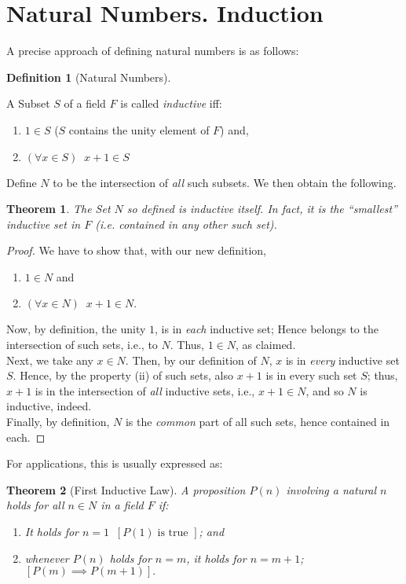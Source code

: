 \documentclass[12pt]{book}
\newtheorem{theorem}{Theorem}
\theoremstyle{definition}
\newtheorem{definition}{Definition}[section]
\begin{document}
\section{Natural Numbers. Induction}
A precise approach of defining natural numbers is as follows: 
\begin{definition}[Natural Numbers]
\

A Subset $S$ of a field $F$ is called \textit{inductive} iff:
\begin{enumerate}[label=(\roman*)]
	\item $1\in S$ ($S$ contains the unity element of $F$) and, 
	\item $(\forall x \in S)\;\; x+1\in S$
\end{enumerate}
Define $N$ to be the intersection of \textit{all} such subsets. We then obtain the following. 
\end{definition}
\begin{theorem}
	The Set $N$ so defined is inductive itself. In fact, it is the ``smallest'' inductive set in $F$ (i.e. contained in any other such set).
\end{theorem}
\begin{proof}
	We have to show that, with our new definition, 
	\begin{enumerate}[label=(\roman*)]
		\item $1 \in N$ and
		\item $(\forall x \in N)\;\; x+1 \in N.$
	\end{enumerate}
	
	\indent Now, by definition, the unity $1$, is in \textit{each} inductive set; Hence belongs to the intersection of such sets, i.e., to $N$. Thus, $1 \in N$, as claimed.\\
	\indent Next, we take any $x \in N$. Then, by our definition of $N$, $x$ is in \textit{every} inductive set $S$. Hence, by the property (ii) of such sets, also $x+1$ is in every such set $S$; thus, $x+1$ is in the intersection of \textit{all} inductive sets, i.e., $x+1 \in N$, and so $N$ is inductive, indeed. \\
	\indent Finally, by definition, $N$ is the \textit{common} part of all such sets, hence contained in each.
\end{proof}
For applications, this is usually expressed as: 
\begin{theorem}[First Inductive Law]
A proposition $P(n)$ involving a natural $n$ holds for all $n \in N$ in a field $F$ if:
\begin{enumerate}[label=(\roman*)]
	\item It holds for $n=1\;\; [P(1)\; \text{is true } ]$; and
	\item whenever $P(n)$ holds for $n=m$, it holds for $n=m+1$; $[P(m) \implies P(m+1)].$ 
\end{enumerate}
\end{theorem}
\end{document}
